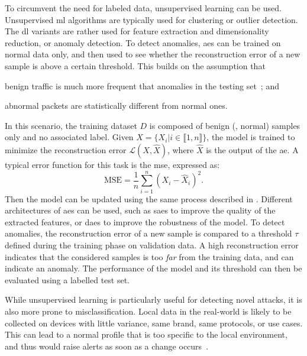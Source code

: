 To circumvent the need for labeled data, unsupervised learning can be used.
Unsupervised \gls{ml} algorithms are typically used for clustering or outlier detection.
The \gls{dl} variants are rather used for feature extraction and dimensionality reduction, or anomaly detection.
To detect anomalies, \glspl{ae} can be trained on normal data only, and then used to see whether the reconstruction error of a new sample is above a certain threshold.
This builds on the assumption that
\begin{enumerate*}[(i)]
  \item benign traffic is much more frequent that anomalies in the testing set~\cite{chandola_Anomalydetectionsurvey_2009}; and
  \item abnormal packets are statistically different from normal ones.
\end{enumerate*}
In this scenario, the training dataset $D$ is composed of benign (\ie, normal) samples only and no associated label.
Given $X = \lbrace X_i | i \in \llbracket 1, n \rrbracket \rbrace $, the model is trained to minimize the reconstruction error $\mathcal{L}(X, \hat{X})$, where $\hat{X}$ is the output of the \gls{ae}.
A typical error function for this task is the \gls{mse}, expressed as:
\begin{equation}
  \text{MSE} = \frac{1}{n} \sum_{i=1}^{n} \left( X_i - \hat{X}_i \right)^2.
\end{equation}
Then the model can be updated using the same process described in .
Different architectures of \glspl{ae} can be used, such as \glspl{sae} to improve the quality of the extracted features, or \glspl{dae} to improve the robustness of the model. 
To detect anomalies, the reconstruction error of a new sample is compared to a threshold $\tau$ defined during the training phase on validation data.
A high reconstruction error indicates that the considered samples is too \emph{far} from the training data, and can indicate an anomaly.
The performance of the model and its threshold can then be evaluated using a labelled test set.

While unsupervised learning is particularly useful for detecting novel attacks, it is also more prone to misclassification.
Local data in the real-world is likely to be collected on devices with little variance, \eg same brand, same protocols, or use cases.
This can lead to a normal profile that is too specific to the local environment, and thus would raise alerts as soon as a change occurs~\cite{liu_MachineLearningDeep_2019}.

